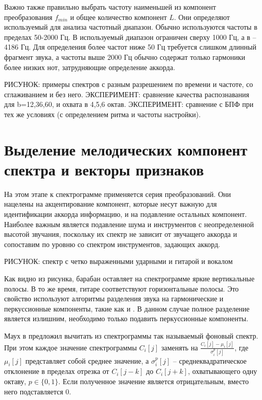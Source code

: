 Важно также правильно выбрать частоту наименьшей из компонент преобразования
$f_{min}$ и общее количество компонент $L$. Они определяют используемый для
анализа частотный диапазон. Обычно используются частоты в пределах 50-2000 Гц.
В \cite{Weller2009} используемый диапазон ограничен сверху 1000 Гц, а в
\cite{Cho2011} -- 4186 Гц. Для определения более частот ниже 50 Гц требуется
слишком длинный фрагмент звука, а частоты выше 2000 Гц обычно содержат только
гармоники более низких нот, затрудняющие определение аккорда.

РИСУНОК: примеры спектров с разным разрешением по времени и частоте, со
сглаживанием и без него.
ЭКСПЕРИМЕНТ: сравнение качества распознавания для b=12,36,60, и
охвата в 4,5,6 октав.
ЭКСПЕРИМЕНТ: сравнение с БПФ при тех же условиях (с определением ритма и частоты
настройки).


\section{Выделение мелодических компонент спектра и векторы признаков}
\label{sect1_feat}

На этом этапе к спектрограмме применяется серия преобразований. Они нацелены на
акцентирование компонент, которые несут важную для идентификации аккорда
информацию, и на подавление остальных компонент. Наиболее важным является
подавление шума и инструментов с неопределенной высотой звучания, поскольку их
спектр не зависит от звучащего аккорда и сопоставим по уровню со спектром
инструментов, задающих аккорд.

РИСУНОК: спектр с четко выраженными ударными и гитарой и вокалом

Как видно из рисунка, барабан оставляет на спектрограмме яркие вертикальные
полосы. В то же время, гитаре соответствуют горизонтальные полосы. Это свойство
используют алгоритмы разделения звука на гармонические и перкуссионные
компоненты, такие как \cite{Ono2008} и \cite{Fitzgerald2010}. В данном случае
полное разделение является излишним, необходимо только подавить перкуссионные
компоненты.

Маух в \cite{Mauch2010} предложил вычитать из спектрограммы так называемый
фоновый спектр. При этом каждое значение спектрограммы $C_i[j]$ заменять на
$\frac{C_i[j] - \mu_i[j]}{\sigma_i^p[j]}$, где $\mu_i[j]$ представляет собой
среднее значение, а $\sigma_i^p[j]$ -- среднеквадратическое отклонение в
пределах отрезка от $C_i[j-k]$ до $C_i[j+k]$, охватывающего одну октаву, $p \in
\{0, 1\}$. Если полученное значение является отрицательным, вместо него
подставляется 0.

